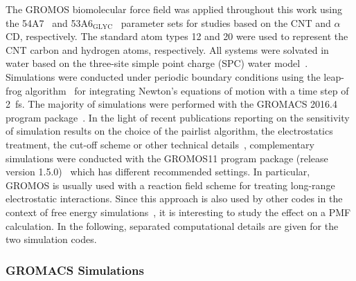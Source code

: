 \documentclass[9pt,lessons,pubversion]{livecoms}
\begin{document}
The GROMOS biomolecular force field was applied throughout this work using the 54A7~\cite{schmid2011definition} and 53A6$_\mathrm{GLYC}$~\cite{pol2012gromos} parameter sets for studies based on the CNT and 
$\alpha$CD, respectively. 
The standard atom types 12 and 20 were used to represent the CNT carbon and hydrogen atoms, respectively. 
All systems were solvated in water based on the three-site simple point charge (SPC) water model~\cite{berendsen1981interaction}.
Simulations were conducted under periodic boundary conditions using the leap-frog algorithm~\cite{eastwood1981computer} for integrating Newton's equations of motion with a time step of 2~fs.
The majority of simulations were performed with the GROMACS 2016.4 program package~\cite{berendsen1995gromacs, hess2008gromacs, abraham2015gromacs}.
In the light of recent publications reporting on the sensitivity of simulation results on the choice of the pairlist algorithm, the electrostatics treatment, the cut-off scheme or other 
technical details~\cite{silva2018impact, gonccalves2019influence, reisser2017real, loeffler2018reproducibility}, complementary simulations were conducted with the GROMOS11 program package (release version 1.5.0)~\cite{kunz2012new, riniker2011calculation, schmid2012architecture} which has different recommended settings.
In particular, GROMOS is usually used with a reaction field scheme for treating long-range electrostatic interactions. Since this approach is also used by other codes in the context of free energy 
simulations~\cite{papadourakis2018blinded, aaqvist2017cold}, it is interesting to study the effect on a PMF calculation.
In the following, separated computational details are given for the two simulation codes.

\subsubsection*{GROMACS Simulations}
\end{document}

